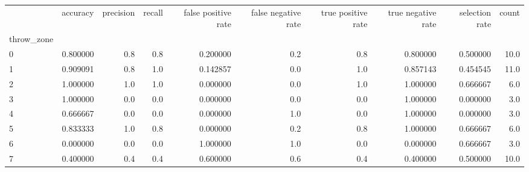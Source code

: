 \begin{tabular}{lrrrrrrrrr}
\toprule
{} &  accuracy &  precision &  recall &  false positive rate &  false negative rate &  true positive rate &  true negative rate &  selection rate &  count \\
throw\_zone &           &            &         &                      &                      &                     &                     &                 &        \\
\midrule
0          &  0.800000 &        0.8 &     0.8 &             0.200000 &                  0.2 &                 0.8 &            0.800000 &        0.500000 &   10.0 \\
1          &  0.909091 &        0.8 &     1.0 &             0.142857 &                  0.0 &                 1.0 &            0.857143 &        0.454545 &   11.0 \\
2          &  1.000000 &        1.0 &     1.0 &             0.000000 &                  0.0 &                 1.0 &            1.000000 &        0.666667 &    6.0 \\
3          &  1.000000 &        0.0 &     0.0 &             0.000000 &                  0.0 &                 0.0 &            1.000000 &        0.000000 &    3.0 \\
4          &  0.666667 &        0.0 &     0.0 &             0.000000 &                  1.0 &                 0.0 &            1.000000 &        0.000000 &    3.0 \\
5          &  0.833333 &        1.0 &     0.8 &             0.000000 &                  0.2 &                 0.8 &            1.000000 &        0.666667 &    6.0 \\
6          &  0.000000 &        0.0 &     0.0 &             1.000000 &                  1.0 &                 0.0 &            0.000000 &        0.666667 &    3.0 \\
7          &  0.400000 &        0.4 &     0.4 &             0.600000 &                  0.6 &                 0.4 &            0.400000 &        0.500000 &   10.0 \\
\bottomrule
\end{tabular}
